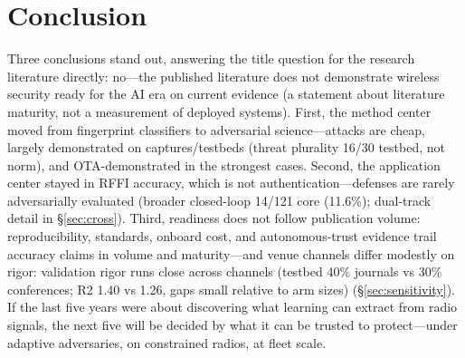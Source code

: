 \section{Conclusion}
\label{sec:conclusion}
Three conclusions stand out, answering the title question for the research literature directly: no---the published literature does not demonstrate wireless security ready for the AI era on current evidence (a statement about literature maturity, not a measurement of deployed systems). First, the method center moved from fingerprint classifiers to adversarial science---attacks are cheap, largely demonstrated on captures/testbeds (threat plurality 16/30 testbed, not norm), and OTA-demonstrated in the strongest cases. Second, the application center stayed in RFFI accuracy, which is not authentication---defenses are rarely adversarially evaluated (broader closed-loop 14/121 core (11.6\%); dual-track detail in \S\ref{sec:cross}). Third, readiness does not follow publication volume: reproducibility, standards, onboard cost, and autonomous-trust evidence trail accuracy claims in volume and maturity---and venue channels differ modestly on rigor: validation rigor runs close across channels (testbed 40\% journals vs 30\% conferences; R2 1.40 vs 1.26, gaps small relative to arm sizes) (\S\ref{sec:sensitivity}). If the last five years were about discovering what learning can extract from radio signals, the next five will be decided by what it can be trusted to protect---under adaptive adversaries, on constrained radios, at fleet scale.
